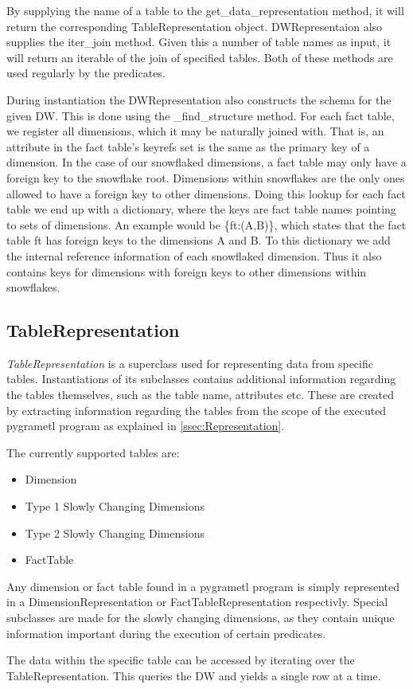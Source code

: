 By supplying the name of a table to the get\_data\_representation method, it will return the corresponding TableRepresentation object. DWRepresentaion also supplies the iter\_join method. Given this a number of table names as input, it will return an iterable of the join of specified tables. Both of these methods are used regularly by the predicates.

During instantiation the DWRepresentation also constructs the schema for the given DW. This is done using the \_find\_structure method. For each fact table, we register all dimensions, which it may be naturally joined with. That is, an attribute in the fact table’s keyrefs set is the same as the primary key of a dimension. In the case of our snowflaked dimensions, a fact table may only have a foreign key to the snowflake root. Dimensions within snowflakes are the only ones allowed to have a foreign key to other dimensions. Doing this lookup for each fact table we end up with a dictionary, where the keys are fact table names pointing to sets of dimensions. An example would be \{ft:(A,B)\}, which states that the fact table ft has foreign keys to the dimensions A and B. To this dictionary we add the internal reference information of each snowflaked dimension. Thus it also contains keys for dimensions with foreign keys to other dimensions within snowflakes.

\subsection{TableRepresentation}
\textit{TableRepresentation} is a superclass used for representing data from specific tables. Instantiations of its subclasses contains additional information regarding the tables themselves, such as the table name, attributes etc. These are created by extracting information regarding the tables from the scope of the executed pygrametl program as explained in \cref{ssec:Representation}.

The currently supported tables are:

\begin{itemize}
\item Dimension
\item Type 1 Slowly Changing Dimensions
\item Type 2 Slowly Changing Dimensions
\item FactTable
\end{itemize}

Any dimension or fact table found in a pygrametl program is simply represented in a DimensionRepresentation or FactTableRepresentation respectivly. Special subclasses are made for the slowly changing dimensions, as they contain unique information important during the execution of certain predicates.

The data within the specific table can be accessed by iterating over the TableRepresentation. This queries the DW and yields a single row at a time.


